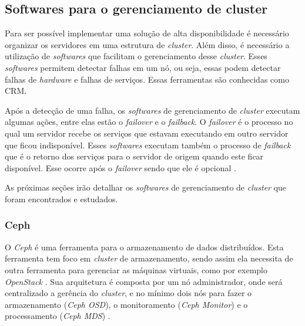 

\subsection{Softwares para o gerenciamento de cluster}
\label{section:toolcluster}

Para ser possível implementar uma solução de alta disponibilidade é necessário organizar os servidores em uma estrutura de \textit{cluster}.
Além disso, é necessário a utilização de \textit{softwares} que facilitam o gerenciamento desse \textit{cluster}. Esses \textit{softwares} 
permitem detectar falhas em um nó, ou seja, essas podem detectar falhas de \textit{hardware} e falhas de serviços. 
Essas ferramentas são conhecidas como \ac{CRM}. 

Após a detecção de uma falha, os \textit{softwares} de gerenciamento de \textit{cluster} executam algumas ações, entre elas estão o 
\textit{failover} e o \textit{failback}. O \textit{failover} é o processo no qual um servidor recebe os serviços que estavam executando em outro 
servidor que ficou indisponível. Esses \textit{softwares} executam também o processo de \textit{failback} que é o retorno dos serviços 
para o servidor de origem quando este ficar disponível. Esse ocorre após o \textit{failover} sendo que ele é opcional \cite{bassan2008}.

As próximas seções irão detalhar os \textit{softwares} de gerenciamento de \textit{cluster} que foram encontrados e estudados.

\subsubsection{Ceph}
\label{section:ceph}
O \textit{Ceph} \cite{ceph} é uma ferramenta para o armazenamento de dados distribuídos. Esta ferramenta tem foco em \textit{cluster} 
de armazenamento, sendo assim ela necessita de outra ferramenta para gerenciar as máquinas virtuais, como por exemplo \textit{OpenStack} 
\cite{openstack}. Sua arquitetura é composta por um nó administrador, onde será centralizado a gerência do \textit{cluster}, e no mínimo dois 
nós para fazer o armazenamento (\textit{Ceph OSD}), o monitoramento (\textit{Ceph Monitor}) e o processamento (\textit{Ceph MDS}) \cite{ceph}.

